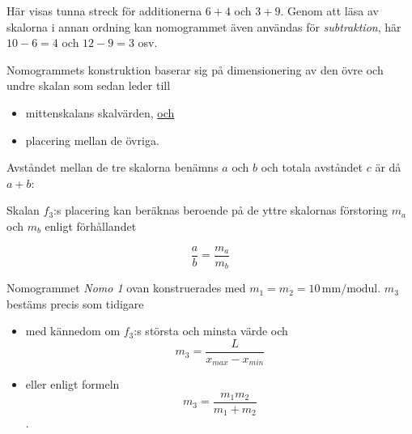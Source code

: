 \documentclass[oneside,11pt,a4paper,swedish]{scrbook}
\begin{document}
Här visas tunna streck för additionerna $6+4$ och $3+9$. Genom att läsa av skalorna i annan ordning kan nomogrammet även användas för \emph{subtraktion}, här $10-6=4$ och $12-9=3$ osv.

Nomogrammets konstruktion  baserar sig på dimensionering av den övre och undre skalan som sedan leder till 

\begin{itemize}
\item mittenskalans skalvärden, \underline{och} 
\item placering mellan de övriga. 
\end{itemize}

\newpage
Avståndet mellan de tre skalorna benämns $a$ och $b$ och totala avståndet $c$ är då $a+b$:



Skalan $f_3$:s placering kan beräknas beroende på de yttre skalornas förstoring $m_a$ och $m_b$ enligt förhållandet

\[ \frac{a}{b}= \frac{m_a}{m_b}\]

Nomogrammet \emph{Nomo 1} ovan konstruerades med $m_1=m_2=10\, \textrm{mm/modul}$. $m_3$ bestäms precis som tidigare  

\begin{itemize}

\item med kännedom om  $f_3$:s största och minsta värde och \[ m_3=\frac{L}{x_{max}-x_{min}} \]
\item eller enligt formeln \[m_3=\frac{m_1m_2}{m_1+m_2}\].
\end{itemize}
\end{document}
